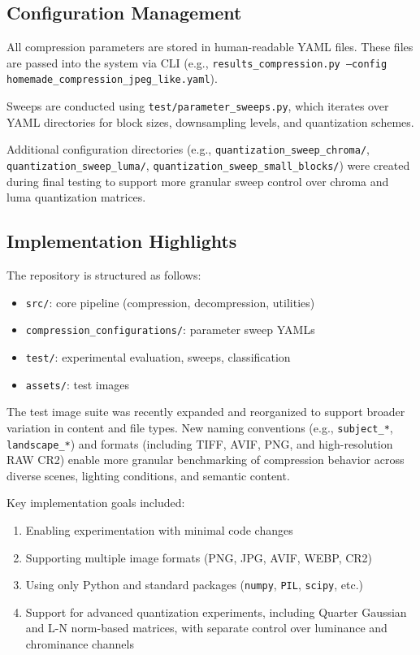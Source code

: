 \subsection{Configuration Management}
\label{sec:config_management}
All compression parameters are stored in human-readable YAML files. These files are passed into the system via CLI (e.g., \texttt{results\_compression.py --config homemade\_compression\_jpeg\_like.yaml}).

Sweeps are conducted using \texttt{test/parameter\_sweeps.py}, which iterates over YAML directories for block sizes, downsampling levels, and quantization schemes.

Additional configuration directories (e.g., \texttt{quantization\_sweep\_chroma/}, \texttt{quantization\_sweep\_luma/}, \texttt{quantization\_sweep\_small\_blocks/}) were created during final testing to support more granular sweep control over chroma and luma quantization matrices.

\subsection{Implementation Highlights}

The repository is structured as follows:
\begin{itemize}
    \item \texttt{src/}: core pipeline (compression, decompression, utilities)
    \item \texttt{compression\_configurations/}: parameter sweep YAMLs
    \item \texttt{test/}: experimental evaluation, sweeps, classification
    \item \texttt{assets/}: test images
\end{itemize}

The test image suite was recently expanded and reorganized to support broader variation in content and file types. New naming conventions (e.g., \texttt{subject\_*}, \texttt{landscape\_*}) and formats (including TIFF, AVIF, PNG, and high-resolution RAW CR2) enable more granular benchmarking of compression behavior across diverse scenes, lighting conditions, and semantic content.

Key implementation goals included:
\begin{enumerate}
    \item Enabling experimentation with minimal code changes
    \item Supporting multiple image formats (PNG, JPG, AVIF, WEBP, CR2)
    \item Using only Python and standard packages (\texttt{numpy}, \texttt{PIL}, \texttt{scipy}, etc.)
    \item Support for advanced quantization experiments, including Quarter Gaussian and L-N norm-based matrices, with separate control over luminance and chrominance channels
\end{enumerate}

